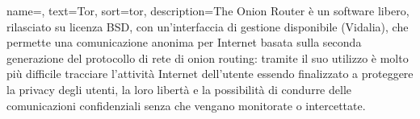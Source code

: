 \renewcommand{\glossaryname}{Glossario}

{
    name=,
    text=Tor,
    sort=tor,
    description={The Onion Router è un software libero, rilasciato su licenza BSD, con un'interfaccia di gestione disponibile (Vidalia), che permette una comunicazione anonima per Internet basata sulla seconda generazione del protocollo di rete di onion routing: tramite il suo utilizzo è molto più difficile tracciare l'attività Internet dell'utente essendo finalizzato a proteggere la privacy degli utenti, la loro libertà e la possibilità di condurre delle comunicazioni confidenziali senza che vengano monitorate o intercettate.}
}


